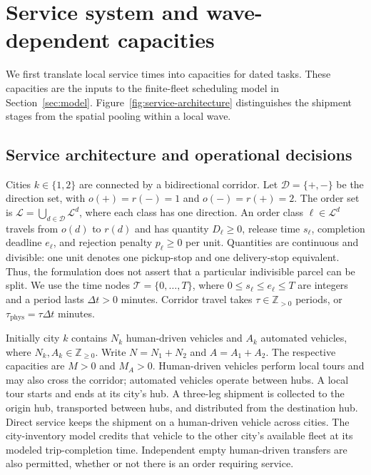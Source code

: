 \section{Service system and wave-dependent capacities}
\label{sec:capacity}

We first translate local service times into capacities for dated tasks.
These capacities are the inputs to the finite-fleet scheduling model in
Section~\ref{sec:model}. Figure~\ref{fig:service-architecture} distinguishes
the shipment stages from the spatial pooling within a local wave.

\subsection{Service architecture and operational decisions}

Cities $k\in\{1,2\}$ are connected by a bidirectional corridor. Let
$\mathcal D=\{+,-\}$ be the direction set, with
$o(+)=r(-)=1$ and $o(-)=r(+)=2$. The order set is
$\mathcal L=\bigcup_{d\in\mathcal D}\mathcal L^d$, where each class has
one direction. An order class
$\ell\in\mathcal L^d$ travels from $o(d)$ to $r(d)$ and has quantity
$D_\ell\geq0$, release time $s_\ell$, completion deadline $e_\ell$, and
rejection penalty $p_\ell\geq0$ per unit. Quantities are continuous and
divisible: one unit denotes one pickup-stop and one delivery-stop equivalent.
Thus, the formulation does not assert that a particular indivisible parcel
can be split. We use the time nodes $\mathcal T=\{0,\ldots,T\}$,
where $0\leq s_\ell\leq e_\ell\leq T$ are integers and a period lasts
$\Delta t>0$ minutes. Corridor travel takes $\tau\in\mathbb Z_{>0}$
periods, or $\tau_{\mathrm{phys}}=\tau\Delta t$ minutes.

Initially city $k$ contains $N_k$ human-driven vehicles and $A_k$ automated
vehicles, where $N_k,A_k\in\mathbb Z_{\geq0}$. Write $N=N_1+N_2$ and
$A=A_1+A_2$. The respective capacities are
$M>0$ and $M_A>0$. Human-driven vehicles perform local tours and may also
cross the corridor; automated vehicles operate between hubs. A local tour
starts and ends at its city's hub. A three-leg shipment is collected to
the origin hub, transported between hubs, and distributed from the
destination hub. Direct service keeps the shipment on a human-driven
vehicle across cities. The city-inventory model credits that vehicle to
the other city's available fleet at its modeled trip-completion time. Independent empty
human-driven transfers are also permitted, whether or not there is an order
requiring service.

